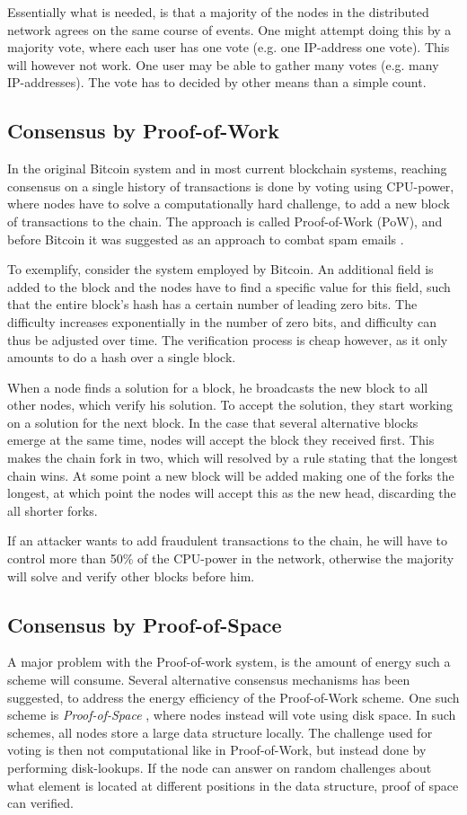 \documentclass[oneside,a4paper,10pts,article]{memoir}
\begin{document}
Essentially what is needed, is that a majority of the nodes in the
distributed network agrees on the same course of events. One might
attempt doing this by a majority vote, where each user has one vote
(e.g. one IP-address one vote). This will however not work. One user
may be able to gather many votes (e.g. many IP-addresses). The vote
has to decided by other means than a simple count.

\subsection{Consensus by Proof-of-Work}
In the original Bitcoin system and in most current blockchain systems,
reaching consensus on a single history of transactions is done by
voting using CPU-power, where nodes have to solve a computationally
hard challenge, to add a new block of transactions to the chain. The
approach is called Proof-of-Work (PoW), and before Bitcoin it was suggested
as an approach to combat spam emails \cite{dwork1992pricing}.

To exemplify, consider the system employed by Bitcoin. An additional
field is added to the block and the nodes have to find a specific
value for this field, such that the entire block's hash has a certain
number of leading zero bits. The difficulty increases exponentially in
the number of zero bits, and difficulty can thus be adjusted over
time. The verification process is cheap however, as it only amounts to
do a hash over a single block.

When a node finds a solution for a block, he broadcasts the new block
to all other nodes, which verify his solution. To accept the solution,
they start working on a solution for the next block. In the case that
several alternative blocks emerge at the same time, nodes will accept
the block they received first. This makes the chain fork in two, which
will resolved by a rule stating that the longest chain wins. At some
point a new block will be added making one of the forks the longest,
at which point the nodes will accept this as the new head, discarding
the all shorter forks.

If an attacker wants to add fraudulent transactions to the chain, he
will have to control more than 50\% of the CPU-power in the network,
otherwise the majority will solve and verify other blocks before him.

\subsection{Consensus by Proof-of-Space}
A major problem with the Proof-of-work system, is the amount of energy
such a scheme will consume. Several alternative consensus mechanisms
has been suggested, to address the energy efficiency of the
Proof-of-Work scheme. One such scheme is \emph{Proof-of-Space}
\cite{dziembowski2015proofs}, where nodes instead will vote using disk
space. In such schemes, all nodes store a large data structure
locally. The challenge used for voting is then not computational like
in Proof-of-Work, but instead done by performing disk-lookups. If the
node can answer on random challenges about what element is located at
different positions in the data structure, proof of space can verified.
\end{document}
